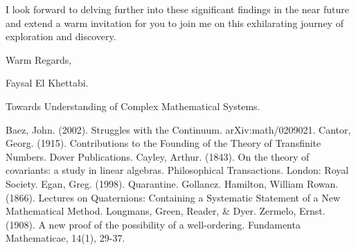 \documentclass{article}
\begin{document}
I look forward to delving further into these significant findings in the near future and extend a warm invitation for you to join me on this exhilarating journey of exploration and discovery.

Warm Regards,

Faysal El Khettabi.

Towards Understanding of Complex Mathematical Systems.
%
%
%
%
%
%
%

\begin{thebibliography}{9}
 Baez, John. (2002). Struggles with the Continuum. arXiv:math/0209021.
 Cantor, Georg. (1915). Contributions to the Founding of the Theory of Transfinite Numbers. Dover Publications.
 Cayley, Arthur. (1843). On the theory of covariants: a study in linear algebras. Philosophical Transactions. London: Royal Society.
 Egan, Greg. (1998). Quarantine. Gollancz.
 Hamilton, William Rowan. (1866). Lectures on Quaternions: Containing a Systematic Statement of a New Mathematical Method. Longmans, 
Green, Reader, \& Dyer.
 Zermelo, Ernst. (1908). A new proof of the possibility of a well-ordering. Fundamenta Mathematicae, 14(1), 29-37.
\end{thebibliography}
\end{document}
